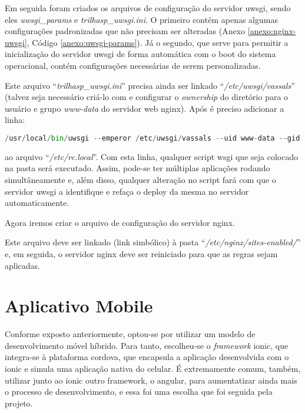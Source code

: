 Em seguida foram criados os arquivos de configuração do servidor \gls{uwsgi}, sendo eles \textit{uwsgi\_params} e \textit{trilhasp\_uwsgi.ini}.
O primeiro contém apenas algumas configurações padronizadas que não precisam ser alteradas (Anexo \ref{anexo:nginx-uwsgi}, Código \ref{anexo:uwsgi-params}). Já o segundo, que serve para permitir a inicialização do servidor \gls{uwsgi} de forma automática com o boot do sistema operacional, contém configurações necessárias de serem personalizadas.


Este arquivo ``\textit{trilhasp\_uwsgi.ini}''  precisa ainda ser linkado ``\textit{/etc/uwsgi/vassals}'' (talvez seja necessário criá-lo com e configurar o \textit{ownership} do diretório para o usuário e grupo \textit{www-data} do servidor web \gls{nginx}). Após é preciso adicionar a linha:
\begin{lstlisting}[language={Python},caption={Inicialização automática do servidor uWSGI}]
/usr/local/bin/uwsgi --emperor /etc/uwsgi/vassals --uid www-data --gid www-data
\end{lstlisting}
ao arquivo ``\textit{/etc/rc.local}''. Com esta linha, qualquer script wsgi que seja colocado na pasta será executado. Assim, pode-se ter múltiplas aplicações rodando simultâneamente e, além disso, qualquer alteração no script fará com que o servidor \gls{uwsgi} a identifique e refaça o deploy da mesma no servidor automaticamente.

Agora iremos criar o arquivo de configuração do servidor nginx.


Este arquivo deve ser linkado (link simbólico) à pasta ``\textit{/etc/nginx/sites-enabled/}'' e, em seguida, o servidor \gls{nginx} deve ser reiniciado para que as regras sejam aplicadas.

\section{Aplicativo Mobile}\label{sec:spec-appmobile}

Conforme exposto anteriormente, optou-se por utilizar um modelo de desenvolvimento móvel híbrido. Para tanto, escolheu-se o \textit{framework} \gls{ionic}, que integra-se à plataforma \gls{cordova}, que encapsula a aplicação desenvolvida com o \gls{ionic} e simula uma aplicação nativa do celular. É extremamente comum, também, utilizar junto ao \gls{ionic} outro framework, o \gls{angular}, para aumentatizar ainda mais o processo de desenvolvimento, e essa foi uma escolha que foi seguida pela projeto.

